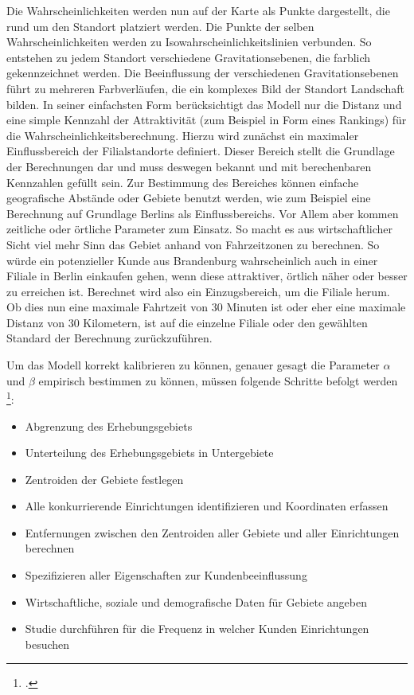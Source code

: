 Die Wahrscheinlichkeiten werden nun auf der Karte als Punkte dargestellt, die rund um den Standort platziert werden. 
Die Punkte der selben Wahrscheinlichkeiten werden zu Isowahrscheinlichkeitslinien verbunden. 
So entstehen zu jedem Standort verschiedene Gravitationsebenen, die farblich gekennzeichnet werden. 
Die Beeinflussung der verschiedenen Gravitationsebenen führt zu mehreren Farbverläufen, die ein komplexes Bild der Standort Landschaft bilden.
In seiner einfachsten Form berücksichtigt das Modell nur die Distanz und eine simple Kennzahl der Attraktivität (zum Beispiel in Form eines Rankings) für die Wahrscheinlichkeitsberechnung. 
Hierzu wird zunächst ein maximaler Einflussbereich der Filialstandorte definiert. 
Dieser Bereich stellt die Grundlage der Berechnungen dar und muss deswegen bekannt und mit berechenbaren Kennzahlen gefüllt sein.
Zur Bestimmung des Bereiches können einfache geografische Abstände oder Gebiete benutzt werden, wie zum Beispiel eine Berechnung auf Grundlage Berlins als Einflussbereichs.
Vor Allem aber kommen zeitliche oder örtliche Parameter zum Einsatz.
So macht es aus wirtschaftlicher Sicht viel mehr Sinn das Gebiet anhand von Fahrzeitzonen zu berechnen.
So würde ein potenzieller Kunde aus Brandenburg wahrscheinlich auch in einer Filiale in Berlin einkaufen gehen, wenn diese attraktiver, örtlich näher oder besser zu erreichen ist.
Berechnet wird also ein Einzugsbereich, um die Filiale herum.
Ob dies nun eine maximale Fahrtzeit von 30 Minuten ist oder eher eine maximale Distanz von 30 Kilometern, ist auf die einzelne Filiale oder den gewählten Standard der Berechnung zurückzuführen.

Um das Modell korrekt kalibrieren zu können, genauer gesagt die Parameter $\alpha$ und $\beta$ empirisch bestimmen zu können, müssen folgende Schritte befolgt werden \footcite{huff_calibrating_2008}:

\begin{itemize}
	\item Abgrenzung des Erhebungsgebiets
	\item Unterteilung des Erhebungsgebiets in Untergebiete
	\item Zentroiden der Gebiete festlegen
	\item Alle konkurrierende Einrichtungen identifizieren und Koordinaten erfassen
	\item Entfernungen zwischen den Zentroiden aller Gebiete und aller Einrichtungen berechnen
	\item Spezifizieren aller Eigenschaften zur Kundenbeeinflussung
	\item Wirtschaftliche, soziale und demografische Daten für Gebiete angeben
	\item Studie durchführen für die Frequenz in welcher Kunden Einrichtungen besuchen
\end{itemize}

